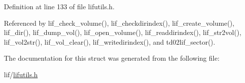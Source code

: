 Definition at line 133 of file lifutils.\+h.



Referenced by lif\+\_\+check\+\_\+volume(), lif\+\_\+checkdirindex(), lif\+\_\+create\+\_\+volume(), lif\+\_\+dir(), lif\+\_\+dump\+\_\+vol(), lif\+\_\+open\+\_\+volume(), lif\+\_\+readdirindex(), lif\+\_\+str2vol(), lif\+\_\+vol2str(), lif\+\_\+vol\+\_\+clear(), lif\+\_\+writedirindex(), and td02lif\+\_\+sector().



The documentation for this struct was generated from the following file\+:\begin{DoxyCompactItemize}
\item 
lif/\hyperlink{lifutils_8h}{lifutils.\+h}\end{DoxyCompactItemize}
